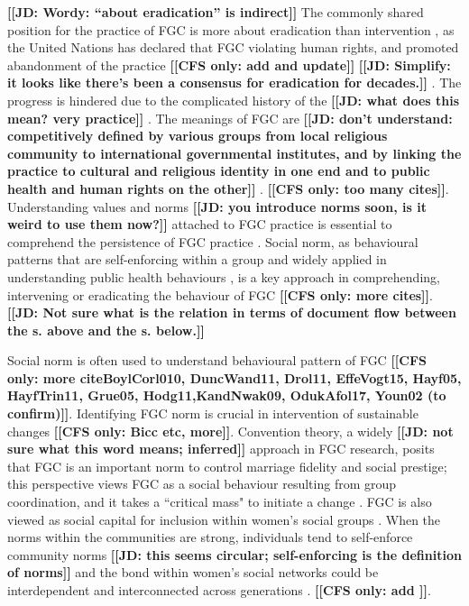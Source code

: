 \documentclass[12pt,]{article}
\newcommand{\comment}[1]{\textbf{[[#1]]}}
\newcommand{\cfonly}[1]{\comment{CFS only: #1}}
\newcommand{\jdcmt}[1]{\comment{JD: #1}}
\begin{document}
\jdcmt{Wordy: ``about eradication'' is indirect} The commonly shared position for the practice of FGC is more about eradication than intervention \cite{KhosBane17, Mack96, Toub94, UNIC16, WHO97}, as the United Nations has declared that FGC violating human rights, and promoted abandonment of the practice  \cite{WHO97, WHO08} \cfonly{add and update} \jdcmt{Simplify: it looks like there's been a consensus for eradication for decades.} .  The progress is hindered due to the complicated history of the \jdcmt{what does this mean? very practice} \cite{BergDeni12, Cami16}. The meanings of FGC are \jdcmt{don't understand: competitively defined by various groups from local religious community to international governmental institutes, and by linking the practice to cultural and religious identity in one end and to public health and human rights on the other} \cite{AhmeKare18, BergDeni13a, Boyl02, BoylMcMo02, Grue01, KhosBane17, KimaShell18, SchuLien13, WHO12}. \cfonly{too many cites}.  Understanding values and norms \jdcmt{you introduce norms soon, is it weird to use them now?} attached to FGC practice is essential to comprehend the persistence of FGC practice \cite{}.  Social norm, as behavioural patterns that are self-enforcing within a group \cite{Youn15} and widely applied in understanding public health behaviours \cite{Ajze91, Ajze02, CislHeis18a,MollRima10, RimaLapi15}, is a key approach in comprehending,  intervening or eradicating the behaviour of FGC \cite{Bicc10, BiccMari15, Mack96, Mack00, MackLeJe08, RimaLapi15, Youn11, UNIC10, UNIC13} \cfonly{more cites}.
\jdcmt{Not sure what is the relation in terms of document flow between the s. above and the s. below.} 

Social norm is often used to understand behavioural pattern of FGC \cfonly{more cite{BoylCorl010, DuncWand11, Drol11, EffeVogt15, Hayf05, HayfTrin11, Grue05, Hodg11,KandNwak09, OdukAfol17, Youn02} (to confirm)}.  Identifying FGC norm is crucial in intervention of sustainable changes \cite{EffeVogt15, RimaLapi15} \cfonly{Bicc etc, more}.  Convention theory, a widely \jdcmt{not sure what this word means; inferred} approach in FGC research, posits that FGC is an important norm to control marriage fidelity and social prestige; this perspective views FGC as a social behaviour resulting from group coordination,  and it takes a ``critical mass" to initiate a change \cite{Mack00, MackLeJe08}.  FGC is also viewed as social capital for inclusion within women’s social groups \cite{Shel-Wand11}.  When the norms within the communities are strong, individuals tend to self-enforce community norms \jdcmt{this seems circular; self-enforcing is the definition of norms} \cite{Ajze02, Hayf05, KandNwak09, KandShel19, Mack96, Mack06, MackLeJe08, ThomMadd92} and the bond within women's social networks could be interdependent and interconnected across generations  \cite{Mack00, DuncWand11, ShelWand11}. \cfonly{add \cite{Bicc15}}.  
\end{document}
